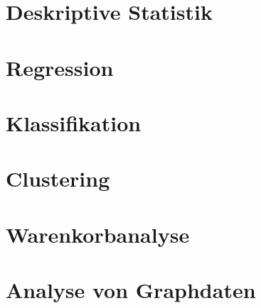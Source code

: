 \documentclass{scrartcl}
\begin{document}
\section{Deskriptive Statistik}

\section{Regression}

\section{Klassifikation}

\section{Clustering}

\section{Warenkorbanalyse}

\section{Analyse von Graphdaten}
\end{document}
